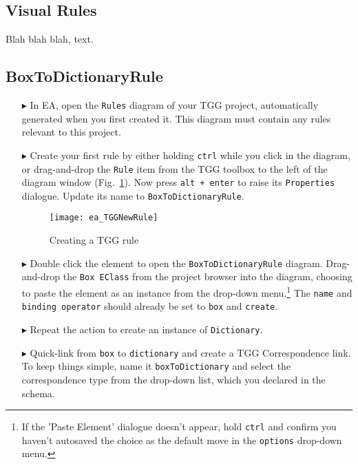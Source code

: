 \newpage
\hypertarget{rules vis}{}
\subsection{Visual Rules}
\visHeader


Blah blah blah, text.

\subsection{BoxToDictionaryRule}
\begin{enumerate}
\item[$\blacktriangleright$] In EA, open the \texttt{Rules} diagram of your TGG project, automatically generated when you first created it. This diagram must
contain any rules relevant to this project.

\item[$\blacktriangleright$] Create your first rule by either holding \texttt{ctrl} while you click in the diagram, or drag-and-drop the \texttt{Rule} item from
the TGG toolbox to the left of the diagram window (Fig.~\ref{fig:create_tgg_rule}). Now press \texttt{alt + enter} to raise its \texttt{Properties} dialogue.
Update its name to \texttt{BoxToDictionaryRule}.

\vspace{0.5cm}

\begin{figure}[htbp]
\begin{center}
  \texttt{[image: ea\_TGGNewRule]}
  \caption{Creating a TGG rule}
  \label{fig:create_tgg_rule}
\end{center}
\end{figure}

\item[$\blacktriangleright$] Double click the element to open the \texttt{BoxToDictionaryRule} diagram. Drag-and-drop the \texttt{Box EClass} from the project
browser into the diagram, choosing to paste the element as an instance from the drop-down menu.\footnote{If the 'Paste Element' dialogue doesn't appear, hold
\texttt{ctrl} and confirm you haven't autosaved the choice as the default move in the \texttt{options} drop-down menu.} The \texttt{name} and \texttt{binding
operator} should already be set to \texttt{box} and \texttt{create}.

\item[$\blacktriangleright$] Repeat the action to create an instance of \texttt{Dictionary}.

\item[$\blacktriangleright$] Quick-link from \texttt{box} to \texttt{dictionary} and create a TGG Correspondence link. To keep things simple, name it
\texttt{boxToDictionary} and select the correspondence type from the drop-down list, which you declared in the schema.


\end{enumerate}
